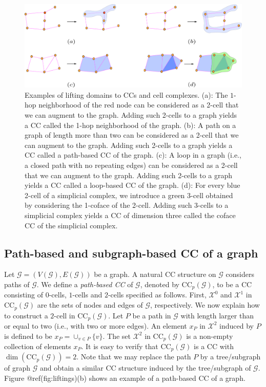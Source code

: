 \documentclass[
  12pt,
]{krantz}
\begin{document}
\begin{figure}

{\centering \includegraphics{figures/lifting_maps} 

}

\caption{Examples of lifting domains to CCs and cell complexes. (a): The $1$-hop neighborhood of the red node can be considered as a 2-cell that we can augment to the graph. Adding such 2-cells to a graph yields a CC called the 1-hop neighborhood of the graph. (b): A path on a graph of length more than two can be considered as a 2-cell that we can augment to the graph. Adding such 2-cells to a graph yields a CC called a path-based CC of the graph. (c): A loop in a graph (i.e., a closed path with no repeating edges) can be considered as a 2-cell that we can augment to the graph. Adding such 2-cells to a graph yields a CC called a loop-based CC of the graph. (d): For every blue 2-cell of a simplicial complex, we introduce a green 3-cell obtained by considering the 1-coface of the 2-cell. Adding such 3-cells to a simplicial complex yields a CC of dimension three called the coface CC of the simplicial complex.}\label{fig:liftings}
\end{figure}

\subsection{Path-based and subgraph-based CC of a
graph}\label{path-based-and-subgraph-based-cc-of-a-graph}

Let \(\mathcal{G}=(V(\mathcal{G}),E(\mathcal{G}))\) be a graph. A
natural CC structure on \(\mathcal{G}\) considers paths of
\(\mathcal{G}\). We define a \emph{path-based CC} of \(\mathcal{G}\),
denoted by \(\mbox{CC}_p(\mathcal{G})\), to be a CC consisting of
\(0\)-cells, \(1\)-cells and \(2\)-cells specified as follows. First,
\(\mathcal{X}^0\) and \(\mathcal{X}^1\) in \(\mbox{CC}_p(\mathcal{G})\)
are the sets of nodes and edges of \(\mathcal{G}\), respectively. We now
explain how to construct a \(2\)-cell in \(\mbox{CC}_p(\mathcal{G})\).
Let \(P\) be a path in \(\mathcal{G}\) with length larger than or equal
to two (i.e., with two or more edges). An element \(x_P\) in
\(\mathcal{X}^2\) induced by \(P\) is defined to be
\(x_P=\cup_{v\in P }\{v\}\). The set \(\mathcal{X}^2\) in
\(\mbox{CC}_p(\mathcal{G})\) is a non-empty collection of elements
\(x_P\). It is easy to verify that \(\mbox{CC}_p(\mathcal{G})\) is a CC
with \(\dim(\mbox{CC}_p(\mathcal{G}))=2\). Note that we may replace the
path \(P\) by a tree/subgraph of graph \(\mathcal{G}\) and obtain a
similar CC structure induced by the tree/subgraph of \(\mathcal{G}\).
Figure @ref(fig:liftings)(b) shows an example of a path-based CC of a
graph.
\end{document}
